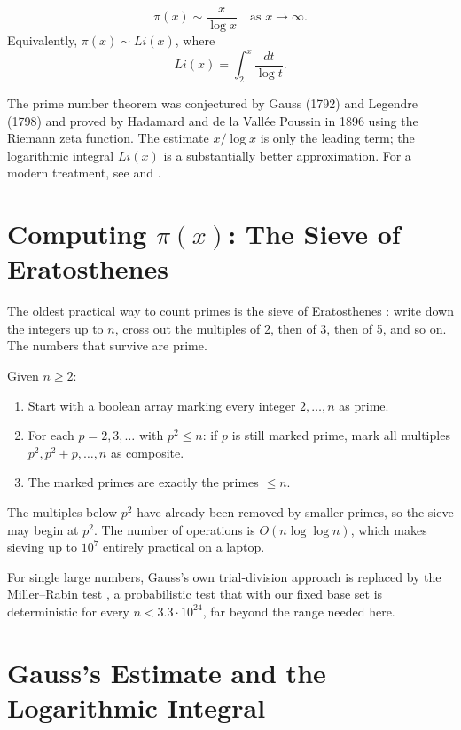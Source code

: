 \begin{theorem}
\[
\pi(x) \sim \frac{x}{\log x} \quad \text{as } x \to \infty.
\]
Equivalently, $\pi(x) \sim Li(x)$, where
\[
Li(x) = \int_2^x \frac{dt}{\log t}.
\]
\end{theorem}

The prime number theorem was conjectured by Gauss (1792) and Legendre (1798) and proved by Hadamard and de la Vall\'ee Poussin in 1896 using the Riemann zeta function. The estimate $x/\log x$ is only the leading term; the logarithmic integral $Li(x)$ is a substantially better approximation. For a modern treatment, see \cite{davenport} and \cite{montgomery-vaughan}.

\section{Computing $\pi(x)$: The Sieve of Eratosthenes}

The oldest practical way to count primes is the sieve of Eratosthenes : write down the integers up to $n$, cross out the multiples of 2, then of 3, then of 5, and so on. The numbers that survive are prime.

\begin{algorithmthm}
Given $n \ge 2$:
\begin{enumerate}
    \item Start with a boolean array marking every integer $2, \ldots, n$ as prime.
    \item For each $p = 2, 3, \ldots$ with $p^2 \le n$: if $p$ is still marked prime, mark all multiples $p^2, p^2 + p, \ldots, n$ as composite.
    \item The marked primes are exactly the primes $\le n$.
\end{enumerate}
\end{algorithmthm}

The multiples below $p^2$ have already been removed by smaller primes, so the sieve may begin at $p^2$. The number of operations is $O(n \log \log n)$, which makes sieving up to $10^7$ entirely practical on a laptop.

For single large numbers, Gauss's own trial-division approach is replaced by the Miller--Rabin test , a probabilistic test that with our fixed base set is deterministic for every $n < 3.3 \cdot 10^{24}$, far beyond the range needed here.

\section{Gauss's Estimate and the Logarithmic Integral}

